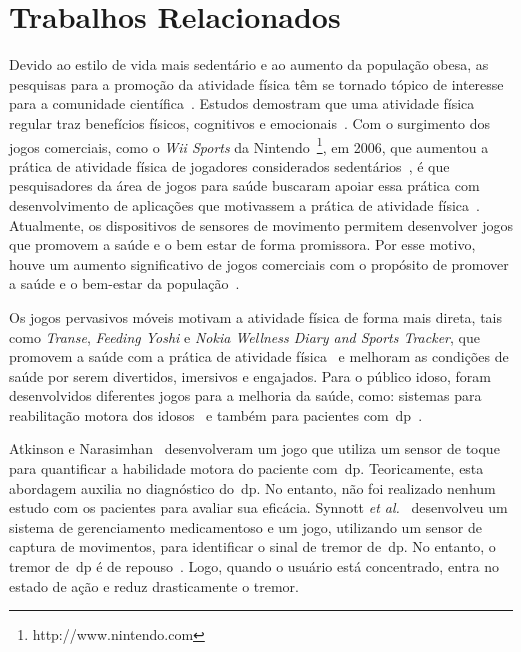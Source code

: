\section{Trabalhos Relacionados}\label{section:trabalhos_relacionados}
Devido ao estilo de vida mais sedentário e ao aumento da população obesa, as pesquisas para a promoção da atividade física têm se tornado tópico de interesse para a comunidade científica~\cite{maitland2009,bartolome11,Mandryk2014}. Estudos demostram que uma atividade física regular traz benefícios físicos, cognitivos e emocionais~\cite{Mandryk2014}. Com o surgimento dos jogos comerciais, como o \textit{Wii Sports} da Nintendo~\footnote{http://www.nintendo.com}, em 2006, que aumentou a prática de atividade física de jogadores considerados sedentários~\cite{wiigraves2008}, é que pesquisadores da área de jogos para saúde buscaram apoiar essa prática com desenvolvimento de aplicações que motivassem a prática de atividade física~\cite{stacey2011}. Atualmente, os dispositivos de sensores de movimento permitem desenvolver jogos que promovem a saúde e o bem estar de forma promissora. Por esse motivo, houve um aumento significativo de jogos comerciais com o propósito de promover a saúde e o bem-estar da população~\cite{Papastergiou:2009:EPC:1570538.1570707}.


Os jogos pervasivos móveis motivam a atividade física de forma mais direta, tais como \textit{Transe}, \textit{Feeding Yoshi} e  \textit{Nokia Wellness Diary and Sports Tracker}, que promovem a saúde com a prática de atividade física~\cite{Suhonen:2008:SFE:1457199.1457204} e melhoram as condições de saúde por serem divertidos, imersivos e engajados. Para o público idoso, foram desenvolvidos diferentes jogos para a melhoria da saúde, como: sistemas para reabilitação motora dos idosos~\cite{brox11} e também para pacientes com~\ac{dp}~\cite{atkinson2010,synnott_wiipd_2012,sacbespoke2014}. 

Atkinson e Narasimhan~\cite{atkinson2010} desenvolveram um jogo que utiliza um sensor de toque para quantificar a habilidade motora do paciente com~\ac{dp}. Teoricamente, esta abordagem auxilia no diagnóstico do~\ac{dp}. No entanto, não foi realizado nenhum estudo com os pacientes para avaliar sua eficácia. Synnott \textit{et al.}~\cite{synnott_wiipd_2012} desenvolveu um sistema de gerenciamento medicamentoso e um jogo, utilizando um sensor de captura de movimentos, para identificar o sinal de tremor de~\ac{dp}. No entanto, o tremor de~\ac{dp} é de repouso~\cite{national2006parkinson}. Logo, quando o usuário está concentrado, entra no estado de ação e reduz drasticamente o tremor.

